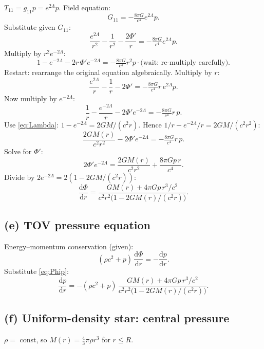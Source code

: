 \documentclass[11pt]{article}
\newcommand{\de}{\mathrm{d}}
\begin{document}
$T_{11} = g_{11}p = e^{2\Lambda}p$. Field equation:
\[
G_{11} = -\tfrac{8\pi G}{c^4}e^{2\Lambda}p.
\]
Substitute given $G_{11}$:
\[
\frac{e^{2\Lambda}}{r^2} - \frac{1}{r^2} - \frac{2\Phi'}{r} = -\tfrac{8\pi G}{c^4}e^{2\Lambda}p.
\]
Multiply by $r^2 e^{-2\Lambda}$:
\[
1 - e^{-2\Lambda} - 2 r\,\Phi' e^{-2\Lambda} = -\tfrac{8\pi G}{c^4}r^2 p \cdot \text{(wait: re-multiply carefully)}.
\]
Restart: rearrange the original equation algebraically. Multiply by $r$:
\[
\frac{e^{2\Lambda}}{r} - \frac{1}{r} - 2\Phi' = -\tfrac{8\pi G}{c^4}r\,e^{2\Lambda}p.
\]
Now multiply by $e^{-2\Lambda}$:
\[
\frac{1}{r} - \frac{e^{-2\Lambda}}{r} - 2\Phi' e^{-2\Lambda} = -\tfrac{8\pi G}{c^4}r\,p.
\]
Use \eqref{eq:Lambda}: $1-e^{-2\Lambda} = 2GM/(c^2 r)$. Hence $1/r - e^{-2\Lambda}/r = 2GM/(c^2 r^2)$:
\[
\frac{2GM(r)}{c^2 r^2} - 2\Phi' e^{-2\Lambda} = -\tfrac{8\pi G}{c^4}r\,p.
\]
Solve for $\Phi'$:
\[
2\Phi' e^{-2\Lambda} = \frac{2GM(r)}{c^2 r^2} + \frac{8\pi G p\,r}{c^4}.
\]
Divide by $2 e^{-2\Lambda} = 2(1-2GM/(c^2 r))$:
\begin{equation}
\boxed{\;\frac{\de\Phi}{\de r} = \frac{GM(r) + 4\pi G p\,r^3/c^2}{c^2 r^2\bigl(1 - 2GM(r)/(c^2 r)\bigr)}.\;}
\label{eq:Phip}
\end{equation}

\subsection*{(e) TOV pressure equation}

Energy--momentum conservation (given):
\[
(\rho c^2 + p)\,\frac{\de\Phi}{\de r} = -\frac{\de p}{\de r}.
\]
Substitute \eqref{eq:Phip}:
\begin{equation}
\boxed{\;\frac{\de p}{\de r} = -(\rho c^2 + p)\,\frac{GM(r) + 4\pi G p\,r^3/c^2}{c^2 r^2\bigl(1 - 2GM(r)/(c^2 r)\bigr)}.\;}
\label{eq:TOV}
\end{equation}

\subsection*{(f) Uniform-density star: central pressure}

$\rho =$ const, so $M(r) = \tfrac{4}{3}\pi\rho r^3$ for $r\le R$.
\end{document}
